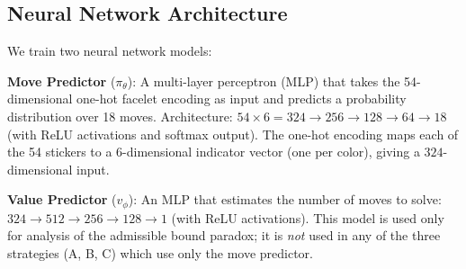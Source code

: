 \documentclass[conference]{IEEEtran}
\begin{document}
\subsection{Neural Network Architecture}
\label{sec:neural-arch}

We train two neural network models:

\textbf{Move Predictor} ($\pi_\theta$): A multi-layer perceptron (MLP) that takes the 54-dimensional one-hot facelet encoding as input and predicts a probability distribution over 18 moves. Architecture: $54 \times 6 = 324 \to 256 \to 128 \to 64 \to 18$ (with ReLU activations and softmax output). The one-hot encoding maps each of the 54 stickers to a 6-dimensional indicator vector (one per color), giving a $324$-dimensional input.

\textbf{Value Predictor} ($v_\phi$): An MLP that estimates the number of moves to solve: $324 \to 512 \to 256 \to 128 \to 1$ (with ReLU activations). This model is used only for analysis of the admissible bound paradox; it is \emph{not} used in any of the three strategies (A, B, C) which use only the move predictor.
\end{document}
